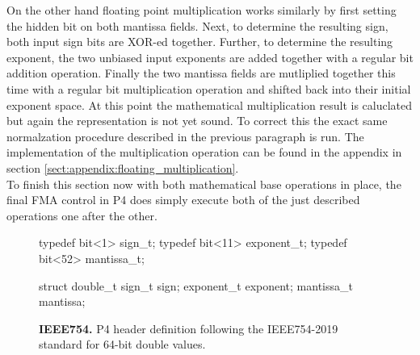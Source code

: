 On the other hand floating point multiplication works similarly by first setting the hidden bit on both mantissa fields. Next, to determine the resulting sign, both input sign bits are XOR-ed together. Further, to determine the resulting exponent, the two unbiased input exponents are added together with a regular bit addition operation. Finally the two mantissa fields are mutliplied together this time with a regular bit multiplication operation and shifted back into their initial exponent space. At this point the mathematical multiplication result is caluclated but again the representation is not yet sound. To correct this the exact same normalzation procedure described in the previous paragraph is run. The implementation of the multiplication operation can be found in the appendix in section \ref{sect:appendix:floating_multiplication}.\\

To finish this section now with both mathematical base operations in place, the final FMA control in P4 does simply execute both of the just described operations one after the other.

\captionsetup[figure]{skip=-10pt} %
\begin{figure}[ht]
  \begin{P4}
typedef bit<1> sign_t;
typedef bit<11> exponent_t;
typedef bit<52> mantissa_t;

struct double_t {
  sign_t sign;
  exponent_t exponent;
  mantissa_t mantissa;
}\end{P4}
  \caption[Double header definition in P4]{
    \textbf{IEEE754.} P4 header definition following the IEEE754-2019 standard for 64-bit double values.
  }
  \label{fig:double_header}
\end{figure}

